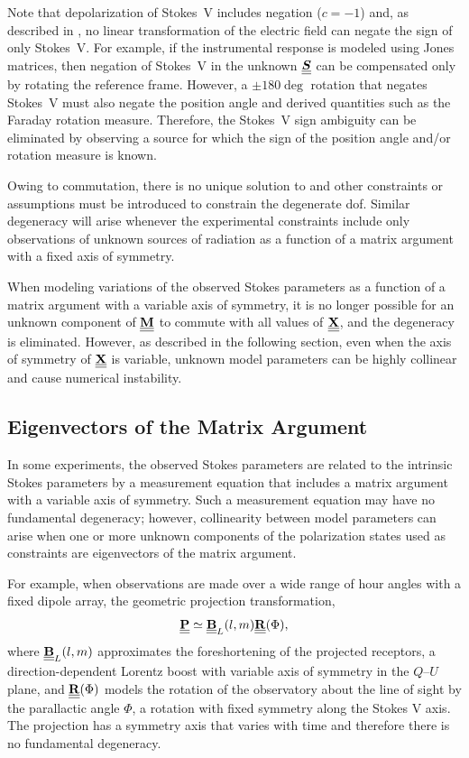Note that depolarization of Stokes~V includes negation ($c = -1$) and,
%
as described in , no linear transformation of the electric field 
can negate the sign of only Stokes~V.  For example, if the instrumental response is modeled 
using Jones matrices, then negation of Stokes~V in the unknown $\underline{\underline{\mbox{\boldmath $S$}}}$
can be compensated only by rotating the reference frame.  However, a $\pm 180\deg$ 
rotation that negates Stokes~V must also negate the position angle and derived
quantities such as the Faraday rotation measure.
%
Therefore, the Stokes~V sign ambiguity can be eliminated by observing a source for which 
the sign of the position angle and/or rotation measure is known.

Owing to commutation, there is no unique solution to  
and other constraints or assumptions must be introduced to constrain
the degenerate dof.
%
Similar degeneracy will arise whenever the experimental constraints
include only observations of unknown sources of radiation
as a function of a matrix argument with a fixed axis of symmetry.

When modeling variations of the observed Stokes parameters as a function of a matrix argument with a variable axis of symmetry, it is no longer possible for an unknown component of $\underline{\underline{{\bf M}}}$ to commute with all values of $\underline{\underline{{\bf X}}}$, and the degeneracy is eliminated.
%
However, as described in the following section, even when the axis of symmetry of $\underline{\underline{{\bf X}}}$ is variable, unknown model parameters can be highly collinear and cause numerical instability.

\subsection{Eigenvectors of the Matrix Argument}
\label{app:eigenvectors_of_projection}

In some experiments, the observed Stokes parameters are related to the intrinsic Stokes parameters by a measurement equation that includes a matrix argument with a variable axis of symmetry.
%
Such a measurement equation may have no fundamental degeneracy; however, collinearity 
between model parameters can arise when one or more unknown components of the polarization states used as constraints are eigenvectors of the matrix argument.


%
For example, when observations are made over a wide range of hour angles with a fixed dipole array, the geometric projection transformation,
%
\begin{equation}
\underline{\underline{{\bf P}}} \simeq
\underline{\underline{{\bf B}}}_L(l,m) \underline{\underline{{\bf R}}}(\Phi),
\end{equation}
%
where $\underline{\underline{{\bf B}}}_L(l,m)$ approximates the foreshortening of the projected receptors, 
%
a direction-dependent Lorentz boost with variable axis of symmetry in the $Q$--$U$ plane,
%
and $\underline{\underline{{\bf R}}}(\Phi)$ models the rotation of the observatory about the line of sight by the parallactic angle $\Phi$,
%
a rotation with fixed symmetry along the Stokes V axis.
%
The projection has a symmetry axis that varies with time and therefore there is no fundamental degeneracy.  

